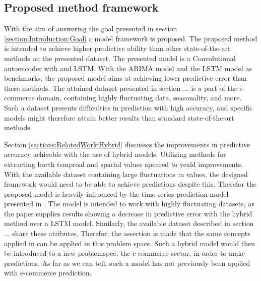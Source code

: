 \subsection{Proposed method framework}


With the aim of answering the goal presented in section \ref{section:Introduction:Goal} a model framework is proposed.
The proposed method is intended to achieve higher predictive ability than other state-of-the-art methods on the presented dataset.
The presented model is a Convolutional autoencoder with and LSTM.
With the ARIMA model and the LSTM model as benchmarks, the proposed model aims at achieving lower predictive error than these methods.
The attained dataset presented in section ... is a part of the e-commerce domain, containing highly fluctuating data, seasonality, and more.
Such a dataset presents difficulties in prediction with high accuracy, and specific models might therefore attain better results than standard state-of-the-art methods.

Section \ref{sections:RelatedWork:Hybrid} discusses the improvements in predictive accuracy achivable with the use of hybrid models.
Utilizing methods for extracting borth temproal and spacial values apeared to yeald improvements.
With the available dataset containing large fluctuations in values, the designed framework would need to be able to achieve predictions despite this.
Therefor the proposed model is heavily influenced by the time series prediction model presented in \cite{Zhao2019}.
The model is intended to work with highly fluctuating datasets, as the paper supplies results showing a decrease in predictive error with the hybrid method over a LSTM model.
Similarly, the available dataset described in section ... share these atributes.
Therefor, the assertion is made that the same concepts applied in \cite{Zhao2019} can be applied in this problem space.
Such a hybrid model would then be introduced to a new problemspce, the e-commerce sector, in order to make predictions.
As far as we can tell, such a model has not previously been applied with e-commerce prediction.

